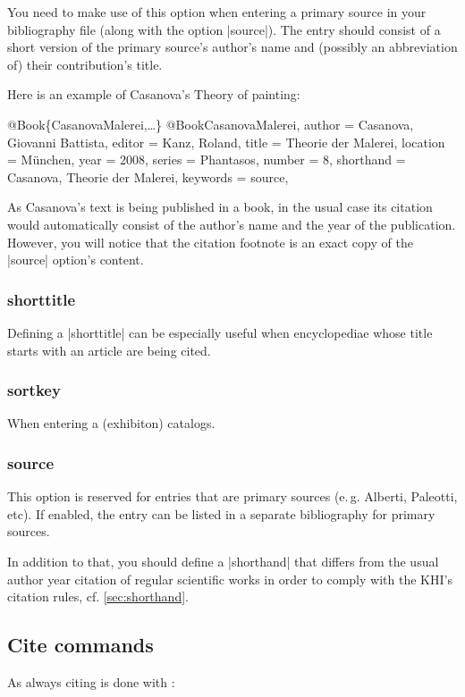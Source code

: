 \documentclass[a4paper,
10pt,
ngerman,
english
]{ltxdoc}
\begin{document}
You need to make use of this option when entering a primary source in your bibliography file (along with the option |source|). The entry should consist of a short version of the primary source's author's name and (possibly an abbreviation of) their contribution's title.

Here is an example of Casanova's Theory of painting:
\begin{bibexample}[label=CasanovaMalerei]{{@}Book\{CasanovaMalerei,…\}}
@Book{CasanovaMalerei,
  author    = {Casanova, Giovanni Battista},
  editor    = {Kanz, Roland},
  title     = {Theorie der Malerei},
  location  = {München},
  year      = {2008},
  series    = {Phantasos},
  number    = {8},
  shorthand = {Casanova, Theorie der Malerei},
  keywords  = {source},
}
\end{bibexample}
As Casanova's text is being published in a book, in the usual case its citation would automatically consist of the author's name and the year of the publication.
However, you will notice that the citation footnote is an exact copy of the |source| option's content.

\subsubsection{shorttitle}
Defining a |shorttitle| can be especially useful when encyclopediae whose title starts with an article are being cited.

\subsubsection{sortkey}
When entering a (exhibiton) catalogs.

\subsubsection{source}
This option is reserved for entries that are primary sources (e.\,g. Alberti, Paleotti, etc). %
If enabled, the entry can be listed in a separate bibliography for primary sources.

In addition to that, you should define a |shorthand| that differs from the usual author year citation of regular scientific works in order to comply with the KHI's citation rules, cf. \cref{sec:shorthand}.


\subsection{Cite commands}\label{cite-commands}
\DescribeMacro{\cite}%
As always citing is done with :
\end{document}
